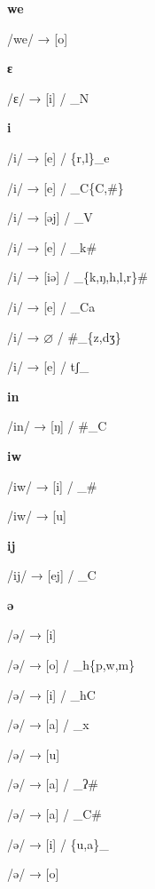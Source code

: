 \begin{center}\textbf{we}\end{center}
\begin{multicols}{4}
\noindent /we/ → [o]
\end{multicols}


\begin{center}\textbf{ɛ}\end{center}
\begin{multicols}{4}
\noindent /ɛ/ → [i] / \_N
\end{multicols}


\begin{center}\textbf{i}\end{center}
\begin{multicols}{4}
\noindent /i/ → [e] / \{r,l\}\_e

\noindent /i/ → [e] / \_C\{C,\#\}

\noindent /i/ → [əj] / \_V

\noindent /i/ → [e] / \_k\#

\noindent /i/ → [iə] / \_\{k,ŋ,h,l,r\}\#

\noindent /i/ → [e] / \_Ca

\noindent /i/ → $\varnothing$ / \#\_\{z,dʒ\}

\noindent /i/ → [e] / tʃ\_
\end{multicols}


\begin{center}\textbf{in}\end{center}
\begin{multicols}{4}
\noindent /in/ → [ŋ] / \#\_C
\end{multicols}


\begin{center}\textbf{iw}\end{center}
\begin{multicols}{4}
\noindent /iw/ → [i] / \_\#

\noindent /iw/ → [u]
\end{multicols}


\begin{center}\textbf{ij}\end{center}
\begin{multicols}{4}
\noindent /ij/ → [ej] / \_C
\end{multicols}


\begin{center}\textbf{ə}\end{center}
\begin{multicols}{4}
\noindent /ə/ → [i]

\noindent /ə/ → [o] / \_h\{p,w,m\}

\noindent /ə/ → [i] / \_hC

\noindent /ə/ → [a] / \_x

\noindent /ə/ → [u]

\noindent /ə/ → [a] / \_ʔ\#

\noindent /ə/ → [a] / \_C\#

\noindent /ə/ → [i] / \{u,a\}\_

\noindent /ə/ → [o]
\end{multicols}


